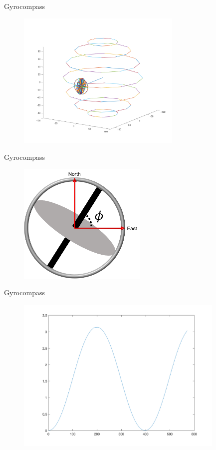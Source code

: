 \documentclass[10pt]{beamer}
\begin{document}
\begin{frame}{Gyrocompass}
    \begin{figure}
    	
    		\centering
    		\includegraphics[width=0.7\textwidth]{gyrocompass_at_equator.png}
    		
    
    \end{figure}
    
\end{frame}
\begin{frame}{Gyrocompass}
    \begin{figure}
    		\centering
    		\includegraphics[width=0.55\textwidth]{define_phi.png}
  
    \end{figure}
\end{frame}

\begin{frame}{Gyrocompass}
    \begin{figure}
    	
    		\centering
    		\includegraphics[width=0.89\textwidth]{L5000.png}
    		
    \end{figure}
\end{frame}
\end{document}
